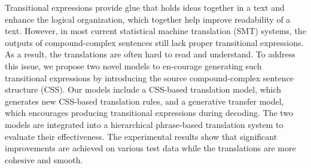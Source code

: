 Transitional expressions provide glue that holds ideas together in a text and enhance the logical organization, which together help improve readability of a text. However, in most current statistical machine translation (SMT) systems, the outputs of compound-complex sentences still lack proper transitional expressions. As a result, the translations are often hard to read and understand. To address this issue, we propose two novel models to en-courage generating such transitional expressions by introducing the source compound-complex sentence structure (CSS). Our models include a CSS-based translation model, which generates new CSS-based translation rules, and a generative transfer model, which encourages producing transitional expressions during decoding. The two models are integrated into a hierarchical phrase-based translation system to evaluate their effectiveness. The experimental results show that significant improvements are achieved on various test data while the translations are more cohesive and smooth.
